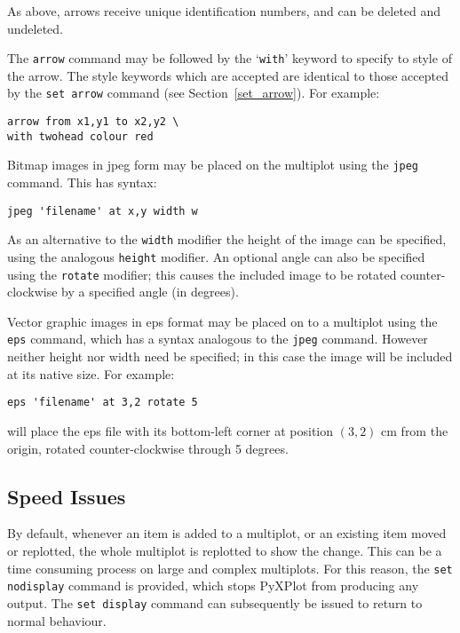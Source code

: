 \documentclass[a4paper,onecolumn,11pt]{book}
\begin{document}
As above, arrows receive unique identification numbers, and can be deleted and
undeleted.

The \texttt{arrow} command may be followed by the `\texttt{with}' keyword to
specify to style of the arrow. The style keywords which are accepted are
identical to those accepted by the \texttt{set arrow} command (see
Section~\ref{set_arrow}). For example:

\begin{verbatim} 
arrow from x1,y1 to x2,y2 \
with twohead colour red
\end{verbatim}

 Bitmap images in jpeg form may be
placed on the multiplot using the {\tt jpeg} command.  This has syntax:

\begin{verbatim}
jpeg 'filename' at x,y width w
\end{verbatim}

As an alternative to the {\tt width} modifier the height of the image can be
specified, using the analogous {\tt height} modifier.  An optional angle can
also be specified using the {\tt rotate} modifier; this causes the included
image to be rotated counter-clockwise by a specified angle (in degrees).

 Vector graphic images in eps format may
be placed on to a multiplot using the {\tt eps} command, which has a syntax
analogous to the {\tt jpeg} command.  However neither height nor width need be
specified; in this case the image will be included at its native size.  For
example:

\begin{verbatim}
eps 'filename' at 3,2 rotate 5
\end{verbatim}

\noindent will place the eps file with its bottom-left corner at position
$(3,2)$ cm from the origin, rotated counter-clockwise through 5 degrees.

\subsection{Speed Issues}
\label{set_display}

By default, whenever an item is added to a multiplot, or an existing item moved
or replotted, the whole multiplot is replotted to show the change. This can be
a time consuming process on large and complex multiplots. For this reason, the
\texttt{set nodisplay}\index{set display command@\texttt{set display} command}
command is provided, which stops PyXPlot from producing any output. The
\texttt{set display} command can subsequently be issued to return to normal
behaviour.
\end{document}
